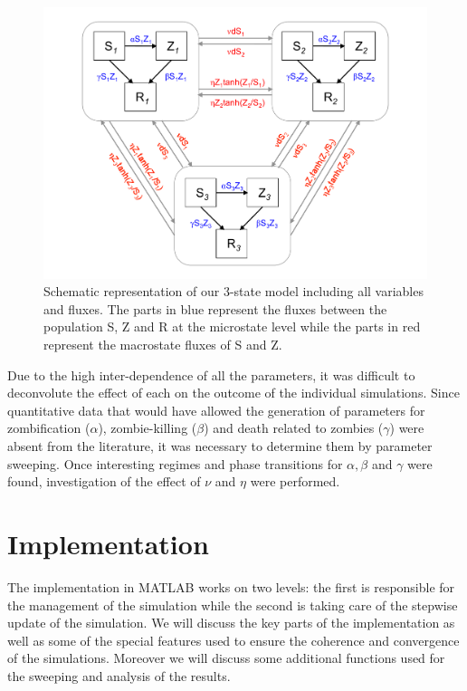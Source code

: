 \documentclass[11pt]{article} %
\begin{document}
\begin{figure}[h!]
\centerline{
\includegraphics[scale=0.45]{../images/Powerpoint_figures/total_model.pdf}}
\caption{Schematic representation of our 3-state model including all variables and fluxes. The parts in blue represent the fluxes between the population S, Z and R at the microstate level while the parts in red represent the macrostate fluxes of S and Z.\label{totalmodel} }
\end{figure}


Due to the high inter-dependence of all the parameters, it was difficult to deconvolute the effect of each on the outcome of the individual simulations. Since quantitative data that would have allowed the generation of parameters for zombification ($\alpha$), zombie-killing ($\beta$) and death related to zombies ($\gamma$) were absent from the literature, it was necessary to determine them by parameter sweeping. Once interesting regimes and phase transitions for $\alpha, \beta$ and $\gamma$ were found, investigation of the effect of $\nu$ and $\eta$ were performed.


\newpage
\section{Implementation}\indent

The implementation in MATLAB works on two levels: the first is responsible for the management of the simulation while the second is taking care of the stepwise update of the simulation. We will discuss the key parts of the implementation as well as some of the special features used to ensure the coherence and convergence of the simulations. Moreover we will discuss some additional functions used for the sweeping and analysis of the results.
\end{document}
